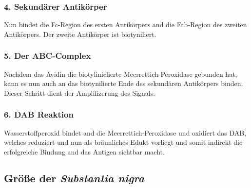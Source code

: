 \documentclass[12pt,a4paper,pdftex]{article}
\begin{document}
\subsubsection*{4. Sekundärer Antikörper}
Nun bindet die Fc-Region des ersten Antikörpers and die Fab-Region des zweiten Antikörpers. Der zweite Antikörper ist biotyniliert.

\subsubsection*{5. Der ABC-Complex}
Nachdem das Avidin die biotylinielierte Meerrettich-Peroxidase gebunden hat, kann es nun auch an das biotynilierte Ende des sekundären Antikörpers binden. Dieser Schritt dient der Amplifizerung des Signals.

\subsubsection*{6. DAB Reaktion}
Wasserstoffperoxid bindet and die Meerrettich-Peroxidase und oxidiert das DAB, welches reduziert und nun als bräunliches Edukt vorliegt und somit indirekt die erfolgreiche Bindung and das Antigen sichtbar macht.

\subsection{Größe der \textit{Substantia nigra}}
\end{document}
